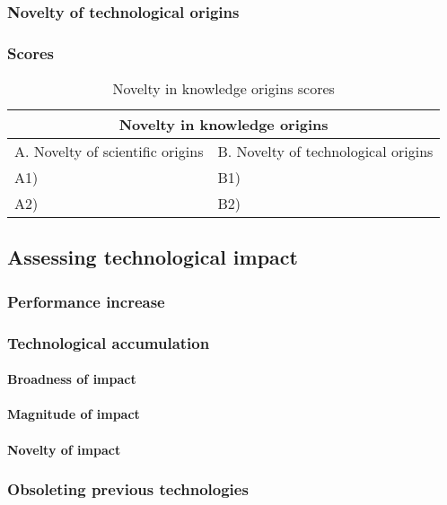 \subsubsection{Novelty of technological origins}

\subsubsection{Scores}
\begin{table}[h]
\centering
\begin{tabular}{l l}
\hline
\multicolumn{2}{|c|}{Novelty in knowledge origins} \\
\hline
A. Novelty of scientific origins & B. Novelty of technological origins\\
A1) & B1)\\ 
A2) & B2)\\ 
\hline
\end{tabular}
\caption{Novelty in knowledge origins scores}
\label{tbl:origscores2}
\end{table}

\subsection{Assessing technological impact}
\subsubsection{Performance increase}

\subsubsection{Technological accumulation}
\paragraph{Broadness of impact}

\paragraph{Magnitude of impact}

\paragraph{Novelty of impact}

\subsubsection{Obsoleting previous technologies}

